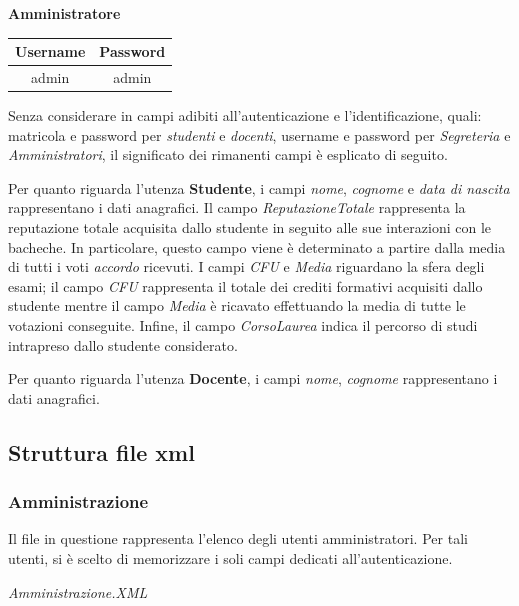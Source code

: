 \documentclass [a4paper,11pt]{book}
\begin{document}
\textbf{Amministratore}

\medskip


\begin{tabular}{|c|c|}
\hline
Username & Password \\
\hline
admin & admin\\
\hline
\end{tabular}

\medskip
\medskip

Senza considerare in campi adibiti all'autenticazione e l'identificazione, quali: matricola e password per \emph{studenti} e \emph{docenti}, username e password per \emph{Segreteria} e \emph{Amministratori}, il significato dei rimanenti campi è esplicato di seguito.

\medskip

Per quanto riguarda l'utenza \textbf{Studente}, i campi \emph{nome}, \emph{cognome} e \emph{data di nascita} rappresentano i dati anagrafici. 
Il campo \emph{ReputazioneTotale} rappresenta la reputazione totale acquisita dallo studente in seguito alle sue interazioni con le bacheche. In particolare, questo campo viene è determinato a partire dalla media di tutti i voti \emph{accordo} ricevuti.
I campi \emph{CFU} e \emph{Media} riguardano la sfera degli esami; il campo \emph{CFU} rappresenta il totale dei crediti formativi acquisiti dallo studente mentre il campo \emph{Media} è ricavato effettuando la media di tutte le votazioni conseguite.
Infine, il campo \emph{CorsoLaurea} indica il percorso di studi intrapreso dallo studente considerato.

\medskip

Per quanto riguarda l'utenza \textbf{Docente}, i campi \emph{nome}, \emph{cognome} rappresentano i dati anagrafici.

\subsection{Struttura file xml}

\subsubsection{Amministrazione}

Il file in questione rappresenta l'elenco degli utenti amministratori. Per tali utenti, si è scelto di memorizzare i soli campi dedicati all'autenticazione.

\medskip

\emph{Amministrazione.XML}
\end{document}
